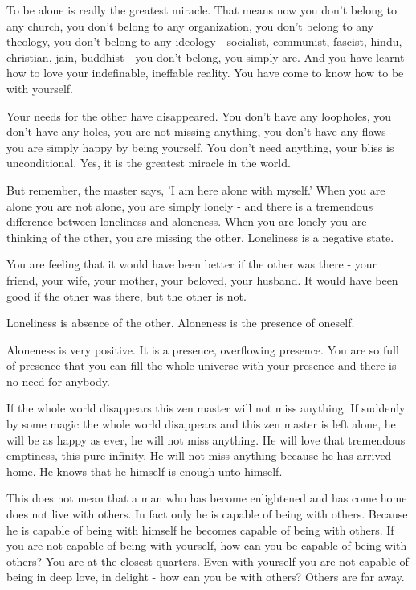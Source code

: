 To be alone is really the greatest miracle. That means now you don't belong to any church, you don't belong to any organization, you don't belong to any theology, you don't belong to any ideology - socialist, communist, fascist, hindu, christian, jain, buddhist - you don't belong, you simply are. And you have learnt how to love your indefinable, ineffable reality. You have come to know how to be with yourself.

Your needs for the other have disappeared. You don't have any loopholes, you don't have any holes, you are not missing anything, you don't have any flaws - you are simply happy by being yourself. You don't need anything, your bliss is unconditional. Yes, it is the greatest miracle in the world.

But remember, the master says, 'I am here alone with myself.' When you are alone you are not alone, you are simply lonely - and there is a tremendous difference between loneliness and aloneness. When you are lonely you are thinking of the other, you are missing the other. Loneliness is a negative state.

You are feeling that it would have been better if the other was there - your friend, your wife, your mother, your beloved, your husband. It would have been good if the other was there, but the other is not.

Loneliness is absence of the other. Aloneness is the presence of oneself.

Aloneness is very positive. It is a presence, overflowing presence. You are so full of presence that you can fill the whole universe with your presence and there is no need for anybody.

If the whole world disappears this zen master will not miss anything. If suddenly by some magic the whole world disappears and this zen master is left alone, he will be as happy as ever, he will not miss anything. He will love that tremendous emptiness, this pure infinity. He will not miss anything because he has arrived home. He knows that he himself is enough unto himself.

This does not mean that a man who has become enlightened and has come home does not live with others. In fact only he is capable of being with others. Because he is capable of being with himself he becomes capable of being with others. If you are not capable of being with yourself, how can you be capable of being with others? You are at the closest quarters. Even with yourself you are not capable of being in deep love, in delight - how can you be with others? Others are far away.


